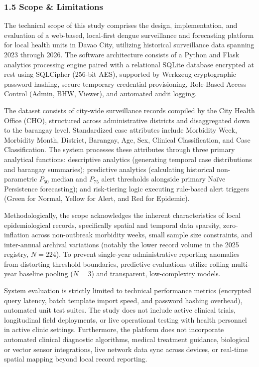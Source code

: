 \documentclass[
]{article}
\begin{document}
\subsubsection{\texorpdfstring{\textbf{1.5 Scope \&
Limitations}}{1.5 Scope \& Limitations}}\label{scope-limitations}

The technical scope of this study comprises the design, implementation,
and evaluation of a web-based, local-first dengue surveillance and
forecasting platform for local health units in Davao City, utilizing
historical surveillance data spanning 2023 through 2026. The software
architecture consists of a Python and Flask analytics processing engine
paired with a relational SQLite database encrypted at rest using
SQLCipher (256-bit AES), supported by Werkzeug cryptographic password
hashing, secure temporary credential provisioning, Role-Based Access
Control (Admin, BHW, Viewer), and automated audit logging.

The dataset consists of city-wide surveillance records compiled by the
City Health Office (CHO), structured across administrative districts and
disaggregated down to the barangay level. Standardized case attributes
include Morbidity Week, Morbidity Month, District, Barangay, Age, Sex,
Clinical Classification, and Case Classification. The system processes
these attributes through three primary analytical functions: descriptive
analytics (generating temporal case distributions and barangay
summaries); predictive analytics (calculating historical non-parametric
\(P_{50}\) median and \(P_{75}\) alert thresholds alongside primary
Naïve Persistence forecasting); and risk-tiering logic executing
rule-based alert triggers (Green for Normal, Yellow for Alert, and Red
for Epidemic).

Methodologically, the scope acknowledges the inherent characteristics of
local epidemiological records, specifically spatial and temporal data
sparsity, zero-inflation across non-outbreak morbidity weeks, small
sample size constraints, and inter-annual archival variations (notably
the lower record volume in the 2025 registry, \(N = 224\)). To prevent
single-year administrative reporting anomalies from distorting threshold
boundaries, predictive evaluations utilize rolling multi-year baseline
pooling (\(N = 3\)) and transparent, low-complexity models.

System evaluation is strictly limited to technical performance metrics
(encrypted query latency, batch template import speed, and password
hashing overhead), automated unit test suites. The study does not
include active clinical trials, longitudinal field deployments, or live
operational testing with health personnel in active clinic settings.
Furthermore, the platform does not incorporate automated clinical
diagnostic algorithms, medical treatment guidance, biological or vector
sensor integrations, live network data sync across devices, or real-time
spatial mapping beyond local record reporting.
\end{document}
